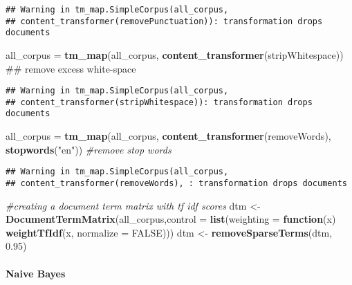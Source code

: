 \documentclass[]{article}
\newenvironment{Shaded}{\begin{snugshade}}{\end{snugshade}}
\newcommand{\KeywordTok}[1]{\textcolor[rgb]{0.13,0.29,0.53}{\textbf{#1}}}
\newcommand{\DataTypeTok}[1]{\textcolor[rgb]{0.13,0.29,0.53}{#1}}
\newcommand{\FloatTok}[1]{\textcolor[rgb]{0.00,0.00,0.81}{#1}}
\newcommand{\StringTok}[1]{\textcolor[rgb]{0.31,0.60,0.02}{#1}}
\newcommand{\CommentTok}[1]{\textcolor[rgb]{0.56,0.35,0.01}{\textit{#1}}}
\newcommand{\OtherTok}[1]{\textcolor[rgb]{0.56,0.35,0.01}{#1}}
\newcommand{\ControlFlowTok}[1]{\textcolor[rgb]{0.13,0.29,0.53}{\textbf{#1}}}
\newcommand{\NormalTok}[1]{#1}
\let\oldparagraph\paragraph
\renewcommand{\paragraph}[1]{\oldparagraph{#1}\mbox{}}
\begin{document}
\begin{verbatim}
## Warning in tm_map.SimpleCorpus(all_corpus,
## content_transformer(removePunctuation)): transformation drops documents
\end{verbatim}

\begin{Shaded}
\begin{Highlighting}[]
\NormalTok{all_corpus =}\StringTok{ }\KeywordTok{tm_map}\NormalTok{(all_corpus, }\KeywordTok{content_transformer}\NormalTok{(stripWhitespace)) ## remove excess white-space }
\end{Highlighting}
\end{Shaded}

\begin{verbatim}
## Warning in tm_map.SimpleCorpus(all_corpus,
## content_transformer(stripWhitespace)): transformation drops documents
\end{verbatim}

\begin{Shaded}
\begin{Highlighting}[]
\NormalTok{all_corpus =}\StringTok{ }\KeywordTok{tm_map}\NormalTok{(all_corpus, }\KeywordTok{content_transformer}\NormalTok{(removeWords), }\KeywordTok{stopwords}\NormalTok{(}\StringTok{"en"}\NormalTok{))  }\CommentTok{#remove stop words}
\end{Highlighting}
\end{Shaded}

\begin{verbatim}
## Warning in tm_map.SimpleCorpus(all_corpus,
## content_transformer(removeWords), : transformation drops documents
\end{verbatim}

\begin{Shaded}
\begin{Highlighting}[]
\CommentTok{#creating a document term matrix with tf idf scores }
\NormalTok{dtm <-}\StringTok{ }\KeywordTok{DocumentTermMatrix}\NormalTok{(all_corpus,}\DataTypeTok{control =} \KeywordTok{list}\NormalTok{(}\DataTypeTok{weighting =} \ControlFlowTok{function}\NormalTok{(x) }\KeywordTok{weightTfIdf}\NormalTok{(x, }\DataTypeTok{normalize =} \OtherTok{FALSE}\NormalTok{)))}
\NormalTok{dtm <-}\StringTok{ }\KeywordTok{removeSparseTerms}\NormalTok{(dtm, }\FloatTok{0.95}\NormalTok{) }
\end{Highlighting}
\end{Shaded}

\paragraph{Naive Bayes}\label{naive-bayes}
\end{document}
